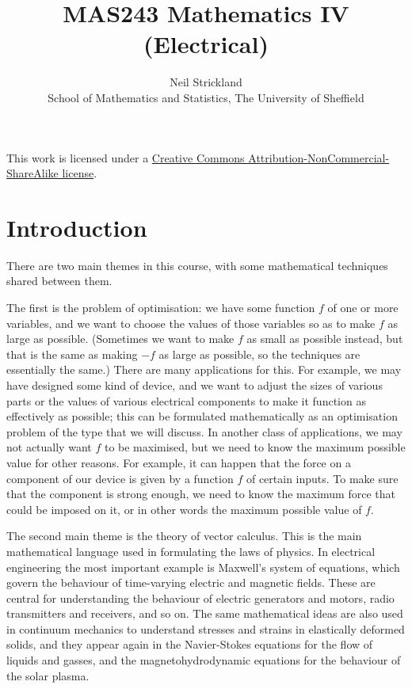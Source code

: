 \documentclass[reqno]{amsart}
\title{MAS243 Mathematics IV (Electrical)}
\author{Neil Strickland\\School of Mathematics and Statistics, The University of Sheffield}
\theoremstyle{definition}
\begin{document}
\maketitle

\begin{center}
 This work is licensed under a 
 \href{https://creativecommons.org/licenses/by-nc-sa/3.0/deed.en}{
  Creative Commons Attribution-NonCommercial-ShareAlike license}.
 
 \bigskip

 \doclicenseImage 
\end{center}


\section{Introduction}
\label{sec-intro}

There are two main themes in this course, with some mathematical
techniques shared between them.  

The first is the problem of optimisation: we have some function $f$ of
one or more variables, and we want to choose the values of those
variables so as to make $f$ as large as possible.  (Sometimes we want
to make $f$ as small as possible instead, but that is the same as
making $-f$ as large as possible, so the techniques are essentially
the same.)  There are many applications for this.  For example, we may
have designed some kind of device, and we want to adjust the sizes of
various parts or the values of various electrical components to make
it function as effectively as possible; this can be formulated
mathematically as an optimisation problem of the type that we will
discuss.  In another class of applications, we may not actually want
$f$ to be maximised, but we need to know the maximum possible value
for other reasons.  For example, it can happen that the force on a
component of our device is given by a function $f$ of certain inputs.
To make sure that the component is strong enough, we need to know the
maximum force that could be imposed on it, or in other words the
maximum possible value of $f$.

The second main theme is the theory of vector calculus.  This is the
main mathematical language used in formulating the laws of physics.
In electrical engineering the most important example is Maxwell's
system of equations, which govern the behaviour of time-varying
electric and magnetic fields.  These are central for understanding the
behaviour of electric generators and motors, radio transmitters and
receivers, and so on.  The same mathematical ideas are also used in
continuum mechanics to understand stresses and strains in elastically
deformed solids, and they appear again in the Navier-Stokes equations
for the flow of liquids and gasses, and the magnetohydrodynamic
equations for the behaviour of the solar plasma.  
\end{document}
